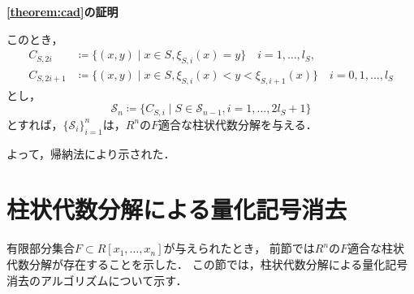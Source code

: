 \documentclass[uplatex, dvipdfmx]{jsarticle}
\makeatletter
\numberwithin{equation}{section}
\renewenvironment{proof}[1][\proofname]{\par
  \pushQED{\qed}%
  \normalfont \topsep6\p@\@plus6\p@\relax
  \trivlist
  \item\relax
  {\bfseries
  #1\@addpunct{.}}\hspace\labelsep\ignorespaces
}{
  \popQED\endtrivlist\@endpefalse
}
\newcommand{\R}{\mathbb{R}}
\newcommand{\calS}{\mathcal{S}}
\theoremstyle{definition}
\newtheorem{definition}{定義}[section]
\renewcommand{\proofname}{\textbf{証明}}
\makeatother
\begin{document}
\begin{proof}[\cref{theorem:cad}の証明]
     このとき，
     \begin{align}
          C_{S,2i} &\coloneqq \{(x,y) \mid  x \in S, \xi_{S,i}(x) = y \} \quad i = 1,\dots, l_S,\\
          C_{S,2i+1} &\coloneqq \{(x,y) \mid x \in S, \xi_{S,i}(x)<y<\xi_{S,i+1}(x) \} \quad i = 0,1, \dots, l_S 
     \end{align}
     とし，
     \begin{equation}
          \calS_n \coloneqq \{C_{S,i} \mid S \in \calS_{n-1}, i=1, \dots, 2l_S+1\}
     \end{equation}
     とすれば，$\{\calS_i\}_{i=1}^n$は，$R^n$の$F$適合な柱状代数分解を与える．

     よって，帰納法により示された．
\end{proof}




\section{柱状代数分解による量化記号消去}

有限部分集合$F \subset R[x_1, \dots, x_n]$が与えられたとき，
前節では$R^n$の$F$適合な柱状代数分解が存在することを示した．
この節では，柱状代数分解による量化記号消去のアルゴリズムについて示す．
\end{document}
